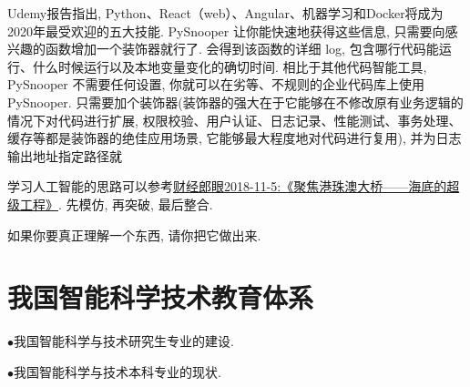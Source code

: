 Udemy报告指出, Python、React（web）、Angular、机器学习和Docker将成为2020年最受欢迎的五大技能.
PySnooper 让你能快速地获得这些信息, 只需要向感兴趣的函数增加一个装饰器就行了.
会得到该函数的详细 log, 包含哪行代码能运行、什么时候运行以及本地变量变化的确切时间.
相比于其他代码智能工具, PySnooper 不需要任何设置, 你就可以在劣等、不规则的企业代码库上使用 PySnooper.
只需要加个装饰器(装饰器的强大在于它能够在不修改原有业务逻辑的情况下对代码进行扩展, 权限校验、用户认证、日志记录、性能测试、事务处理、缓存等都是装饰器的绝佳应用场景, 它能够最大程度地对代码进行复用), 并为日志输出地址指定路径就
\begin{tcolorbox}[colback=yellow!5!white,colframe=yellow!50!black, colbacktitle=yellow!75!black]
学习人工智能的思路可以参考\href{https://www.iqiyi.com/v_19rr3csqmo.html}{财经郎眼2018-11-5:《聚焦港珠澳大桥——海底的超级工程》}. 先模仿, 再突破, 最后整合.
\begin{tcolorbox}[colback=white!50,colframe=orange!50,title=费曼]
\begin{center}
 如果你要真正理解一个东西, 请你把它做出来.
\end{center}
\end{tcolorbox}
\end{tcolorbox}
%
%
%
\section{我国智能科学技术教育体系}
$\bullet$我国智能科学与技术研究生专业的建设.

$\bullet$我国智能科学与技术本科专业的现状.

